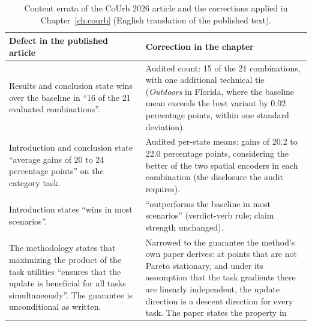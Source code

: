 \begin{table}[htb]
\caption{Content errata of the CoUrb 2026 article and the corrections applied in
Chapter~\ref{ch:courb} (English translation of the published text).}
\label{tab:apx:courb-errata}
\centering
\small
\begin{tabular}{@{}p{}p{}@{}}
\toprule
\textbf{Defect in the published article} & \textbf{Correction in the chapter} \\
\midrule
Results and conclusion state wins over the baseline in ``16 of the 21
evaluated combinations''. &
Audited count: 15 of the 21 combinations, with one additional technical tie
(\emph{Outdoors} in Florida, where the baseline mean exceeds the best variant by
0.02 percentage points, within one standard deviation). \\
\addlinespace
Introduction and conclusion state ``average gains of 20 to 24
percentage points'' on the category task. &
Audited per-state means: gains of 20.2 to 22.0 percentage points, considering the
better of the two spatial encoders in each combination (the disclosure the audit
requires). \\
\addlinespace
Introduction states ``wins in most scenarios''. &
``outperforms the baseline in most scenarios'' (verdict-verb rule; claim
strength unchanged). \\
\addlinespace
The methodology states that maximizing the product of the task utilities ``ensures that the
update is beneficial for all tasks simultaneously''. The guarantee is unconditional as
written. &
Narrowed to the guarantee the method's own paper derives: at points that are not Pareto
stationary, and under its assumption that the task gradients there are linearly independent,
the update direction is a descent direction for every task. The paper states the property in

\end{tabular}
\end{table}
